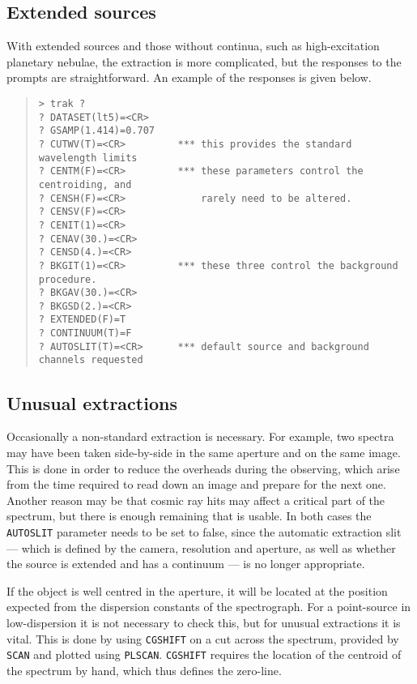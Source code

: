 \subsection{Extended sources}

With extended sources and those without continua, such as high-excitation 
planetary nebulae, the extraction is more complicated, but the responses
to the prompts are straightforward. An example of the responses is given below.
\begin{quote}
\begin{verbatim}
> trak ?
? DATASET(lt5)=<CR>
? GSAMP(1.414)=0.707
? CUTWV(T)=<CR>         *** this provides the standard wavelength limits
? CENTM(F)=<CR>         *** these parameters control the centroiding, and
? CENSH(F)=<CR>             rarely need to be altered. 
? CENSV(F)=<CR>
? CENIT(1)=<CR>
? CENAV(30.)=<CR>
? CENSD(4.)=<CR>
? BKGIT(1)=<CR>         *** these three control the background procedure.
? BKGAV(30.)=<CR>
? BKGSD(2.)=<CR>
? EXTENDED(F)=T   
? CONTINUUM(T)=F 
? AUTOSLIT(T)=<CR>      *** default source and background channels requested
\end{verbatim}
\end{quote}
\subsection{Unusual extractions}

Occasionally a non-standard extraction is necessary. For example, two spectra 
may have been taken side-by-side in the same aperture and on the same image. 
This is done in order to reduce the overheads during the observing, which arise
from the time 
required to read down an image and prepare for the next one. Another reason may 
be that cosmic ray hits may affect a critical part of the spectrum, but there
is enough remaining that is usable. In both cases the {\tt AUTOSLIT} parameter
needs to be set to false, since the automatic extraction slit --- which is 
defined by the camera, resolution and aperture, as well as whether the source 
is extended and has a continuum --- is no longer appropriate. 

If the object is well centred in the aperture, it will be located at the
position expected from the dispersion constants of the spectrograph. For
a point-source in low-dispersion it is not necessary to check this, but for
unusual extractions it is vital. This is done by using {\tt CGSHIFT} on a 
cut across the spectrum, provided by {\tt SCAN} and plotted using {\tt PLSCAN}.
{\tt CGSHIFT} requires the location of the centroid of the spectrum by hand, 
which thus defines the zero-line. 

